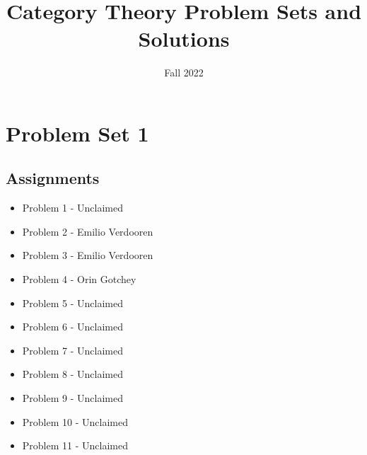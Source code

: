 \documentclass{article}
\title{Category Theory Problem Sets and Solutions}
\author{Fall 2022}
\begin{document}
\maketitle
\tableofcontents
\newpage
\section{Problem Set 1}
\subsection{Assignments}
\begin{itemize}
    \item Problem 1 - Unclaimed
    \item Problem 2 - Emilio Verdooren
    \item Problem 3 - Emilio Verdooren
    \item Problem 4 - Orin Gotchey
    \item Problem 5 - Unclaimed
    \item Problem 6 - Unclaimed
    \item Problem 7 - Unclaimed
    \item Problem 8 - Unclaimed
    \item Problem 9 - Unclaimed
    \item Problem 10 - Unclaimed
    \item Problem 11 - Unclaimed
\end{itemize}
\end{document}
